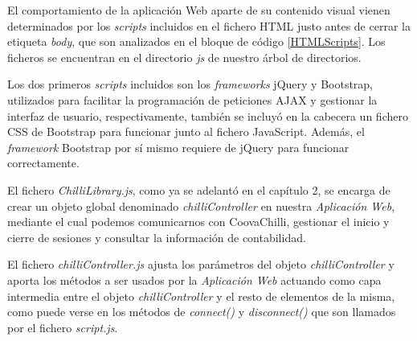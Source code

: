 El comportamiento de la aplicación Web aparte de su contenido visual vienen determinados por los \emph{scripts} incluidos en el fichero HTML justo antes de cerrar la etiqueta \emph{body}, que son analizados en el bloque de código \ref{HTMLScripts}. Los ficheros se encuentran en el directorio \emph{js} de nuestro árbol de directorios.

Los dos primeros \emph{scripts} incluidos son los \emph{frameworks} jQuery y Bootstrap, utilizados para facilitar la programación de peticiones AJAX y gestionar la interfaz de usuario, respectivamente, también se incluyó en la cabecera un fichero CSS de Bootstrap para funcionar junto al fichero JavaScript. Además, el \emph{framework} Bootstrap por sí mismo requiere de jQuery para funcionar correctamente.


El fichero \emph{ChilliLibrary.js}, como ya se adelantó en el capítulo 2, se encarga de crear un objeto global denominado \emph{chilliController} en nuestra \emph{Aplicación Web}, mediante el cual podemos comunicarnos con CoovaChilli, gestionar el inicio y cierre de sesiones y consultar la información de contabilidad.

El fichero \emph{chilliController.js} ajusta los parámetros del objeto \emph{chilliController} y aporta los métodos a ser usados por la \emph{Aplicación Web} actuando como capa intermedia entre el objeto \emph{chilliController} y el resto de elementos de la misma, como puede verse en los métodos de \emph{connect()} y \emph{disconnect()} que son llamados por el fichero \emph{script.js}.


